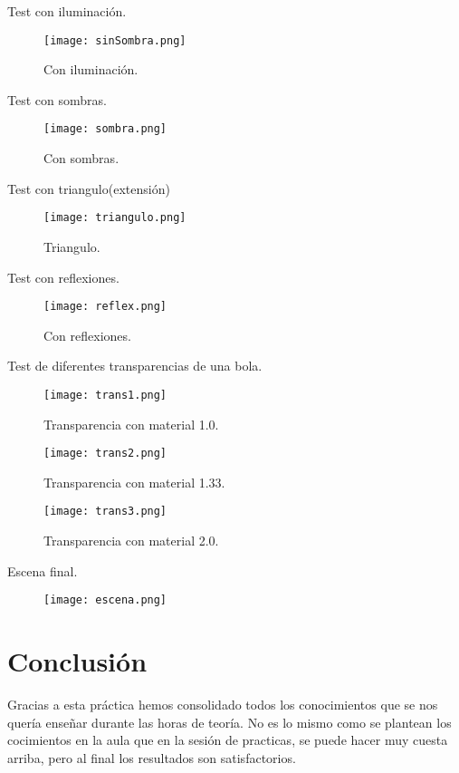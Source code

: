 Test con iluminación.

\begin{figure}[H]
\centering
\texttt{[image: sinSombra.png]}
\caption{Con iluminación.}\label{visina8}
\end{figure}

\newpage
Test con sombras.

\begin{figure}[H]
\centering
\texttt{[image: sombra.png]}
\caption{Con sombras.}\label{visina8}
\end{figure}

Test con triangulo(extensión)

\begin{figure}[H]
\centering
\texttt{[image: triangulo.png]}
\caption{Triangulo.}\label{visina8}
\end{figure}

\newpage
Test con reflexiones.

\begin{figure}[H]
\centering
\texttt{[image: reflex.png]}
\caption{Con reflexiones.}\label{visina8}
\end{figure}

Test de diferentes transparencias de una bola.

\begin{figure}[H]
\centering
\texttt{[image: trans1.png]}
\caption{Transparencia con material 1.0.}\label{visina8}
\end{figure}

\begin{figure}[H]
\centering
\texttt{[image: trans2.png]}
\caption{Transparencia con material 1.33.}\label{visina8}
\end{figure}

\begin{figure}[H]
\centering
\texttt{[image: trans3.png]}
\caption{Transparencia con material 2.0.}\label{visina8}
\end{figure}

\newpage
Escena final.
\begin{figure}[H]
\centering
\texttt{[image: escena.png]}
\end{figure}


\section{Conclusión}

Gracias a esta práctica hemos consolidado todos los conocimientos que se nos quería enseñar durante las horas de teoría. No es lo mismo como se plantean los cocimientos en la aula que en la sesión de practicas, se puede hacer muy cuesta arriba, pero al final los resultados son satisfactorios.
